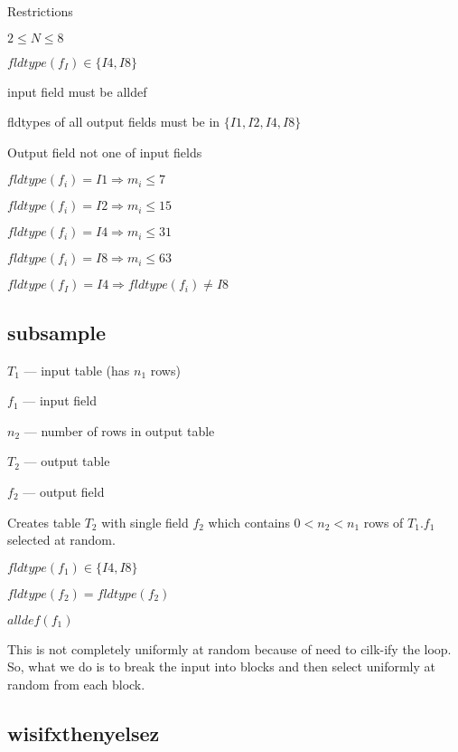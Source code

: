 Restrictions
\be
\item \(2 \leq N \leq 8 \)
\item \(fldtype(f_I) \in \{I4, I8\}\)
\item input field must be alldef
\item fldtypes of all output fields must be in \(\{I1, I2, I4, I8\}\)
\item Output field not one of input fields
\item \(fldtype(f_i) = I1 \Rightarrow m_i \leq 7\)
\item \(fldtype(f_i) = I2 \Rightarrow m_i \leq 15\)
\item \(fldtype(f_i) = I4 \Rightarrow m_i \leq 31\)
\item \(fldtype(f_i) = I8 \Rightarrow m_i \leq 63\)
\item \(fldtype(f_I) = I4 \Rightarrow fldtype(f_i) \neq I8\)
\ee


\subsection{subsample}
\label{subsample}

\be
\item \(T_1\) --- input table (has \(n_1\) rows)
\item \(f_1\) --- input field 
\item \(n_2\) --- number of rows in output table
\item \(T_2\) --- output table
\item \(f_2\) --- output field 
\ee

Creates table \(T_2\) with single field \(f_2\) which contains \(0 < n_2 <
n_1\) rows of \(T_1.f_1\) selected at random. 
\be
\item \(fldtype(f_1) \in \{ I4, I8\}\)
\item \(fldtype(f_2) = fldtype(f_2)\)
\item \(alldef(f_1)\)
\item This is not completely uniformly at random because of need to
cilk-ify the loop. So, what we do is to break the input into blocks and
then select uniformly at random from each block.
\ee

%
\subsection{wisifxthenyelsez}
\label{wisifxthenyelsez}

